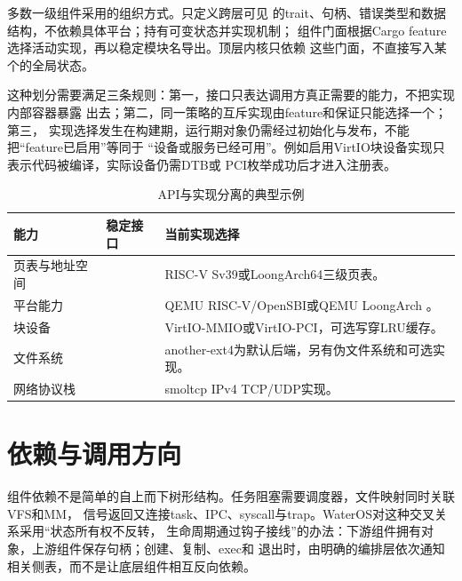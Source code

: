 多数一级组件采用的组织方式。只定义跨层可见
的trait、句柄、错误类型和数据结构，不依赖具体平台；持有可变状态并实现机制；
组件门面根据Cargo feature选择活动实现，再以稳定模块名导出。顶层内核只依赖
这些门面，不直接写入某个的全局状态。

这种划分需要满足三条规则：第一，接口只表达调用方真正需要的能力，不把实现内部容器暴露
出去；第二，同一策略的互斥实现由feature和保证只能选择一个；第三，
实现选择发生在构建期，运行期对象仍需经过初始化与发布，不能把“feature已启用”等同于
“设备或服务已经可用”。例如启用VirtIO块设备实现只表示代码被编译，实际设备仍需DTB或
PCI枚举成功后才进入注册表。

\begin{table}[htbp]
  \centering
  \caption{API与实现分离的典型示例}
  \begin{tabularx}{\textwidth}{L{3.0cm}L{4.7cm}Y}
    \toprule
    能力 & 稳定接口 & 当前实现选择 \\
    \midrule
    页表与地址空间 &  & RISC-V Sv39或LoongArch64三级页表。\\
    平台能力 &  & QEMU RISC-V/OpenSBI或QEMU LoongArch 。\\
    块设备 &  & VirtIO-MMIO或VirtIO-PCI，可选写穿LRU缓存。\\
    文件系统 &  & another-ext4为默认后端，另有伪文件系统和可选实现。\\
    网络协议栈 &  & smoltcp IPv4 TCP/UDP实现。\\
    \bottomrule
  \end{tabularx}
\end{table}

\FloatBarrier
\section{依赖与调用方向}

组件依赖不是简单的自上而下树形结构。任务阻塞需要调度器，文件映射同时关联VFS和MM，
信号返回又连接task、IPC、syscall与trap。WaterOS对这种交叉关系采用“状态所有权不反转，
生命周期通过钩子接线”的办法：下游组件拥有对象，上游组件保存句柄；创建、复制、exec和
退出时，由明确的编排层依次通知相关侧表，而不是让底层组件相互反向依赖。

